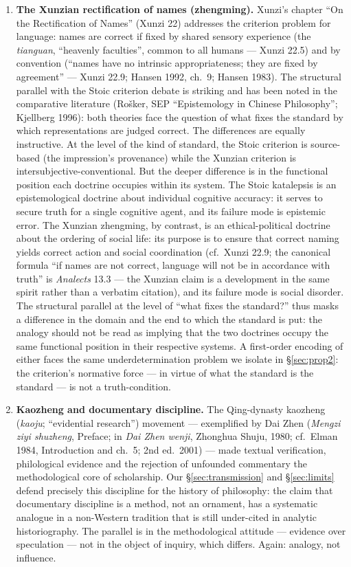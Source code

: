 \documentclass[11pt]{article}
\theoremstyle{plain}
\theoremstyle{definition}
\theoremstyle{remark}
\begin{document}
\begin{enumerate}
\item[(b)] \textbf{The Xunzian rectification of names (zhengming).}
Xunzi's chapter ``On the Rectification of Names'' (Xunzi 22) addresses
the criterion problem for language: names are correct if fixed by
shared sensory experience (the \emph{tianguan}, ``heavenly faculties'',
common to all humans --- Xunzi 22.5) and by convention (``names have no
intrinsic appropriateness; they are fixed by agreement'' --- Xunzi
22.9; Hansen 1992, ch.~9; Hansen 1983). The structural parallel with
the Stoic criterion debate is striking and has been noted in the
comparative literature (Ro\v{s}ker, SEP ``Epistemology in Chinese
Philosophy''; Kjellberg 1996): both theories face the question of what
fixes the standard by which representations are judged correct. The
differences are equally instructive. At the level of the kind of
standard, the Stoic criterion is source-based (the impression's
provenance) while the Xunzian criterion is intersubjective-conventional.
But the deeper difference is in the functional position each doctrine
occupies within its system. The Stoic katalepsis is an epistemological
doctrine about individual cognitive accuracy: it serves to secure truth
for a single cognitive agent, and its failure mode is epistemic error.
The Xunzian zhengming, by contrast, is an ethical-political doctrine
about the ordering of social life: its purpose is to ensure that
correct naming yields correct action and social coordination (cf.\
Xunzi 22.9; the canonical formula ``if names are not correct, language
will not be in accordance with truth'' is \emph{Analects} 13.3 --- the
Xunzian claim is a development in the same spirit rather than a verbatim
citation), and its failure mode is social disorder. The structural
parallel at the level of ``what fixes the standard?'' thus masks a
difference in the domain and the end to which the standard is put: the
analogy should not be read as implying that the two doctrines occupy
the same functional position in their respective systems. A first-order
encoding of either faces the same underdetermination problem we isolate
in \S\ref{sec:prop2}: the criterion's normative force --- in virtue
of what the standard is the standard --- is not a truth-condition.

\item[(c)] \textbf{Kaozheng and documentary discipline.} The Qing-dynasty
kaozheng (\emph{kao\-ju}; ``evidential research'') movement ---
exemplified by Dai Zhen (\emph{Mengzi ziyi shuzheng}, Preface; in
\emph{Dai Zhen wenji}, Zhonghua Shuju, 1980; cf.\ Elman 1984,
Introduction and ch.~5; 2nd ed.\ 2001) --- made textual verification,
philological evidence and the rejection of unfounded commentary the
methodological core of scholarship. Our \S\ref{sec:transmission} and
\S\ref{sec:limits} defend precisely this discipline for the history of
philosophy: the claim that documentary discipline is a method, not an
ornament, has a systematic analogue in a non-Western tradition that is
still under-cited in analytic historiography. The parallel is in the
methodological attitude --- evidence over speculation --- not in the
object of inquiry, which differs. Again: analogy, not influence.
\end{enumerate}
\end{document}
